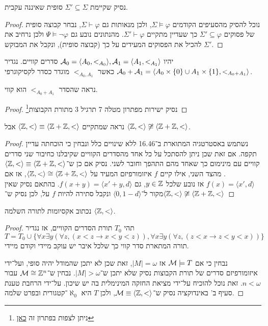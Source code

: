 \subquestion{}
נסיק שקיימת $\Sigma' \subseteq \Sigma$ סופית שאיננה עקבית.
\begin{proof}
	נוכל להסיק מהסעיפים הקודמים $\Sigma \models \varphi$, ולכן מנאותות גם $\Sigma \vdash \varphi$, נבחר קבוצה סופית של פסוקים $\Sigma' \subseteq \varphi$ כך שעדיין מתקיים $\Sigma' \vdash \varphi$.
	מהנתונים נובע גם $\Psi \models \lnot \varphi$ ולכן נרחיב את $\Sigma'$ להכיל את הפסוקים המעידים על כך (קבוצה סופית), ונקבל את המבוקש.
\end{proof}

\question{}
יהיו $\mathcal{A}_0 = \langle A_0, <_{A_0} \rangle, \mathcal{A}_1 = \langle A_1, <_{A_1} \rangle$ סדרים קוויים.
נגדיר $\mathcal{A}_0 + \mathcal{A}_1 = \langle A_0 \times \{ 0 \} \cup A_1 \times \{ 1 \}, <_{A_0 + A_1} \rangle$ כאשר $<_{A_0, A_1}$ מוגדר כסדר לקסיקוגרפי.

\subquestion{}
נראה שהסדר $<_{A_0 + A_1}$ הוא קווי.
\begin{proof}
	נסיק ישירות מפתרון מטלה 7 תרגיל 3 מתורת הקבוצות\footnote{ניתן לצפות בפתרון זה \href{https://raw.githubusercontent.com/D95-waka/Math/refs/heads/master/Set_Theory/bin/ex07.pdf}{כאן}}
\end{proof}

\subquestion{}
נראה שמתקיים $\langle \mathbb{Z}, < \rangle \equiv \langle \mathbb{Z} + \mathbb{Z}, < \rangle$ אבל $\langle \mathbb{Z}, < \rangle \not\cong \langle \mathbb{Z} + \mathbb{Z}, < \rangle$.
\begin{proof}
	נשתמש באסטרטגיה המתוארת ב־16.46 ללא שינויים כלל ונבחין כי הוכחתה עדיין תקפה.
	אם זאת שכן ניתן להסתכל על כל אחד מהסדרים הקוויים שקיבלנו כחיבור שני סדרים קוויים עם מינימום כך שאחד מהם התהפך וחובר לשני.
	נסיק אם כן ש־$\langle \mathbb{Z}, < \rangle \equiv \langle \mathbb{Z} + \mathbb{Z}, < \rangle$.
	מהצד השני, אילו קיים $f$ איזומורפיזם המעיד על $\langle \mathbb{Z}, < \rangle \cong \langle \mathbb{Z} + \mathbb{Z}, < \rangle$, אז אם $f(x) = \langle x', d \rangle$ אז נובע שלכל $y \in \mathbb{Z}$, גם $f(x + y) = \langle x' + y, d \rangle$.
	בהתאם נסיק שאין מקור ל־$\langle 0, 1 - d \rangle$ ונקבל סתירה להיות $f$ על, לכן נסיק ש־$\langle \mathbb{Z}, < \rangle \not\cong \langle \mathbb{Z} + \mathbb{Z}, < \rangle$
\end{proof}

\subquestion{}
נכתוב אקסיומות לתורה השלמה $\langle \mathbb{Z}, < \rangle$.
\begin{proof}
	תהי $T_0$ תורת הסדרים הקוויים, אז נגדיר
	\[
		T = T_0 \cup \{
			\forall x \exists y (\forall z, (x < z \rightarrow x < y < z)), 
			\forall x \exists y (\forall z, (z < x \rightarrow z < y < x))
		\}
	\]
	תורה המתארת סדר קווי כך שלכל איבר יש עוקב מיידי וקודם מיידי.

	נבחין כי אם $\mathcal{M} \models T$ אז $|M| = \omega$, זאת שכן לא יתכן שהמודל יהיה סופי, ועל־ידי איזומורפיזם סדרים של תורת הקבוצות נסיק שלא יתכן ש־$|M| > \omega$.
	נבחין ש־$\mathcal{M} \cong \mathbb{Z}^n$ עבור $n < \omega$.
	זאת נוכל להוכיח על־ידי מציאת החזקה המינימלית בה יש שיכון.
	על־ידי הרחבת טענת סעיף ב' באינדוקציה נסיק ש־$\mathcal{M} \equiv \langle \mathbb{Z}, < \rangle$, ולכן $T$ היא $\aleph_0$־קטגורית ובפרט שלמה.
\end{proof}

